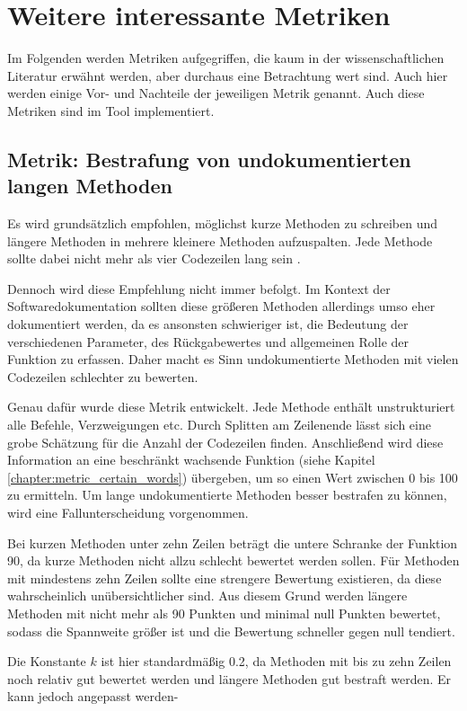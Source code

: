  \section{Weitere interessante Metriken}
 Im Folgenden werden Metriken aufgegriffen, die kaum in der wissenschaftlichen Literatur erwähnt werden, aber durchaus eine Betrachtung wert sind. Auch hier werden einige Vor- und Nachteile der jeweiligen Metrik genannt. Auch diese Metriken sind im Tool implementiert. 
 \subsection{Metrik: Bestrafung von undokumentierten langen Methoden}\label{chapter:method_long}
Es wird grundsätzlich empfohlen, möglichst kurze Methoden zu schreiben und längere Methoden in mehrere kleinere Methoden aufzuspalten. Jede Methode sollte dabei nicht mehr als vier Codezeilen lang sein \cite[S. 34]{martin2009clean}.
 
 Dennoch wird diese Empfehlung nicht immer befolgt. Im Kontext der Softwaredokumentation sollten diese größeren Methoden allerdings umso eher dokumentiert werden, da es ansonsten schwieriger ist, die Bedeutung der verschiedenen Parameter, des Rückgabewertes und allgemeinen Rolle der Funktion zu erfassen. Daher macht es Sinn undokumentierte Methoden mit vielen Codezeilen schlechter zu bewerten.
 
 Genau dafür wurde diese Metrik entwickelt. Jede Methode enthält unstrukturiert alle Befehle, Verzweigungen etc. Durch Splitten am Zeilenende lässt sich eine grobe Schätzung für die Anzahl der Codezeilen finden. Anschließend wird diese Information an eine beschränkt wachsende Funktion (siehe Kapitel \ref{chapter:metric_certain_words}) übergeben, um so einen Wert zwischen 0 bis 100 zu ermitteln. 
  Um lange undokumentierte Methoden besser bestrafen zu können, wird eine Fallunterscheidung vorgenommen.
 
 Bei kurzen Methoden unter zehn Zeilen beträgt die untere Schranke der Funktion 90, da kurze Methoden nicht allzu schlecht bewertet werden sollen. Für Methoden mit mindestens zehn Zeilen sollte eine strengere Bewertung existieren, da diese wahrscheinlich unübersichtlicher sind. Aus diesem Grund werden längere Methoden mit nicht mehr als 90 Punkten und minimal null Punkten bewertet, sodass die Spannweite größer ist und die Bewertung schneller gegen null tendiert.
 
 Die Konstante $k$ ist hier standardmäßig  0.2, da Methoden mit bis zu zehn Zeilen noch relativ gut bewertet werden und längere Methoden gut bestraft werden. Er kann jedoch angepasst werden-
 
